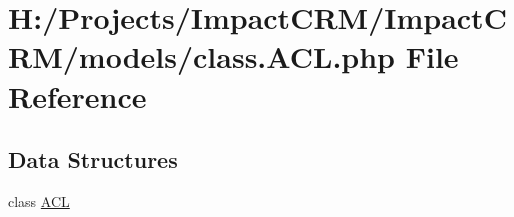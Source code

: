\hypertarget{class_8ACL_8php}{
\section{H:/Projects/ImpactCRM/ImpactCRM/models/class.ACL.php File Reference}
\label{class_8ACL_8php}
}
\subsection*{Data Structures}
\begin{DoxyCompactItemize}
\item 
class \hyperlink{classACL}{ACL}
\end{DoxyCompactItemize}
